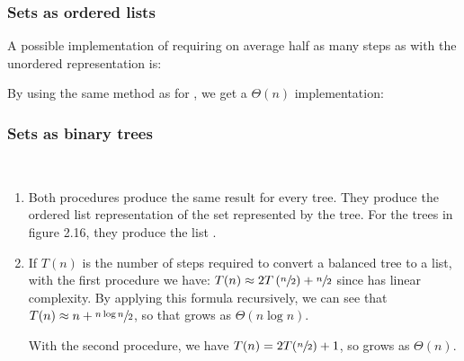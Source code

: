 \subsubsection{Sets as ordered lists}

\begin{exe}[2.61]
    A possible implementation of  requiring on average half as 
    many steps as with the unordered representation is:
\end{exe}

\begin{exe}[2.62]
    By using the same method as for , we get 
    a $\Theta(n)$  implementation:
\end{exe}

\subsubsection{Sets as binary trees}

\begin{exe}[2.63]
    \ \vspace{-20pt}
    \begin{enumerate}
        \item Both procedures produce the same result for every tree. They 
            produce the ordered list representation of the set represented by 
            the tree. For the trees in figure 2.16, they produce the list 
            .
        \item If $T(n)$ is the number of steps required to convert a balanced 
            tree to a list, with the first procedure we have: $T(n) \approx 
            2T\left(\sfrac{n}{2}\right) + \sfrac{n}{2}$ since  has 
            linear complexity. By applying this formula recursively, we can see 
            that $T(n) \approx n +  \sfrac{n \log n}{2}$, so that 
             grows as $\Theta(n \log{n})$.

            With the second procedure, we have $T(n) = 2T(\sfrac{n}{2}) + 1$, so 
             grows as $\Theta(n)$.
    \end{enumerate}
\end{exe}

